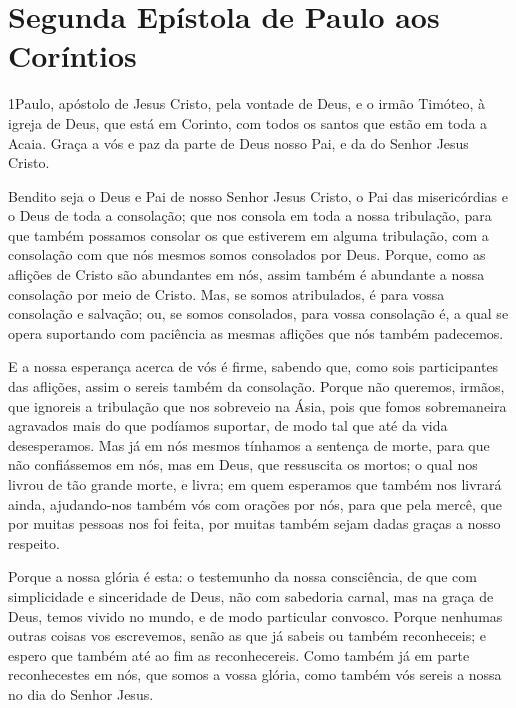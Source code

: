 \thispagestyle{empty}
\chapter*{Segunda Epístola de Paulo aos Coríntios}

\lettrine{1} Paulo, apóstolo de Jesus Cristo, pela vontade de
Deus, e o irmão Timóteo, à igreja de Deus, que está em Corinto, com
todos os santos que estão em toda a Acaia. Graça a vós e paz da
parte de Deus nosso Pai, e da do Senhor Jesus Cristo.

Bendito seja o Deus e Pai de nosso Senhor Jesus Cristo, o Pai das
misericórdias e o Deus de toda a consolação; que nos consola em
toda a nossa tribulação, para que também possamos consolar os que
estiverem em alguma tribulação, com a consolação com que nós mesmos
somos consolados por Deus. Porque, como as aflições de Cristo
são abundantes em nós, assim também é abundante a nossa consolação
por meio de Cristo. Mas, se somos atribulados, é para vossa
consolação e salvação; ou, se somos consolados, para vossa
consolação é, a qual se opera suportando com paciência as mesmas
aflições que nós também padecemos.

E a nossa esperança acerca de vós é firme, sabendo que, como sois
participantes das aflições, assim o sereis também da consolação.
Porque não queremos, irmãos, que ignoreis a tribulação que nos
sobreveio na Ásia, pois que fomos sobremaneira agravados mais do que
podíamos suportar, de modo tal que até da vida desesperamos. Mas
já em nós mesmos tínhamos a sentença de morte, para que não
confiássemos em nós, mas em Deus, que ressuscita os mortos; o
qual nos livrou de tão grande morte, e livra; em quem esperamos que
também nos livrará ainda, ajudando-nos também vós com orações
por nós, para que pela mercê, que por muitas pessoas nos foi feita,
por muitas também sejam dadas graças a nosso respeito.

Porque a nossa glória é esta: o testemunho da nossa consciência,
de que com simplicidade e sinceridade de Deus, não com sabedoria
carnal, mas na graça de Deus, temos vivido no mundo, e de modo
particular convosco. Porque nenhumas outras coisas vos
escrevemos, senão as que já sabeis ou também reconheceis; e espero
que também até ao fim as reconhecereis. Como também já em
parte reconhecestes em nós, que somos a vossa glória, como também
vós sereis a nossa no dia do Senhor Jesus.


